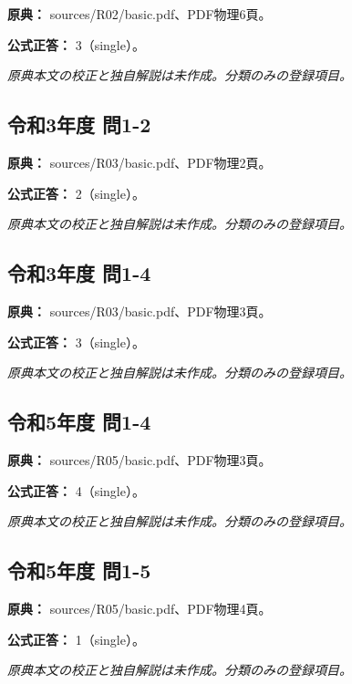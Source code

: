 \noindent\textbf{原典：} sources/R02/basic.pdf、PDF物理6頁。

\textbf{公式正答：} 3（single）。

\par\textit{原典本文の校正と独自解説は未作成。分類のみの登録項目。}

\subsection{令和3年度 問1-2}
\label{q:r03-reg-basic-1-2}

\noindent\textbf{原典：} sources/R03/basic.pdf、PDF物理2頁。

\textbf{公式正答：} 2（single）。

\par\textit{原典本文の校正と独自解説は未作成。分類のみの登録項目。}

\subsection{令和3年度 問1-4}
\label{q:r03-reg-basic-1-4}

\noindent\textbf{原典：} sources/R03/basic.pdf、PDF物理3頁。

\textbf{公式正答：} 3（single）。

\par\textit{原典本文の校正と独自解説は未作成。分類のみの登録項目。}

\subsection{令和5年度 問1-4}
\label{q:r05-reg-basic-1-4}

\noindent\textbf{原典：} sources/R05/basic.pdf、PDF物理3頁。

\textbf{公式正答：} 4（single）。

\par\textit{原典本文の校正と独自解説は未作成。分類のみの登録項目。}

\subsection{令和5年度 問1-5}
\label{q:r05-reg-basic-1-5}

\noindent\textbf{原典：} sources/R05/basic.pdf、PDF物理4頁。

\textbf{公式正答：} 1（single）。

\par\textit{原典本文の校正と独自解説は未作成。分類のみの登録項目。}

